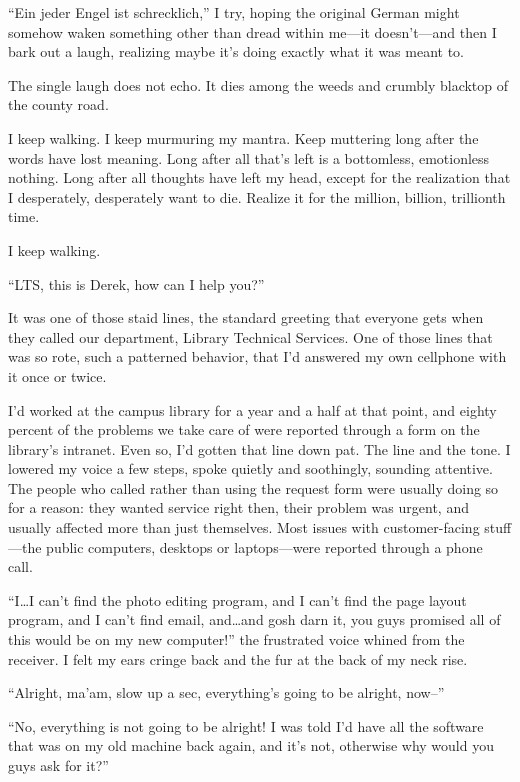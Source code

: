 ``Ein jeder Engel ist schrecklich,'' I try, hoping the original German might somehow waken something other than dread within me---it doesn't---and then I bark out a laugh, realizing maybe it's doing exactly what it was meant to.

The single laugh does not echo. It dies among the weeds and crumbly blacktop of the county road.

I keep walking. I keep murmuring my mantra. Keep muttering long after the words have lost meaning. Long after all that's left is a bottomless, emotionless nothing. Long after all thoughts have left my head, except for the realization that I desperately, desperately want to die. Realize it for the million, billion, trillionth time.

I keep walking.

\secdiv{}

\noindent ``LTS, this is Derek, how can I help you?''

It was one of those staid lines, the standard greeting that everyone gets when they called our department, Library Technical Services. One of those lines that was so rote, such a patterned behavior, that I'd answered my own cellphone with it once or twice.

I'd worked at the campus library for a year and a half at that point, and eighty percent of the problems we take care of were reported through a form on the library's intranet. Even so, I'd gotten that line down pat. The line and the tone. I lowered my voice a few steps, spoke quietly and soothingly, sounding attentive. The people who called rather than using the request form were usually doing so for a reason: they wanted service right then, their problem was urgent, and usually affected more than just themselves. Most issues with  customer-facing stuff---the public computers, desktops or laptops---were reported through a phone call.

``I\ldots{}I can't find the photo editing program, and I can't find the page layout program, and I can't find email, and\ldots{}and gosh darn it, you guys promised all of this would be on my new computer!'' the frustrated voice whined from the receiver. I felt my ears cringe back and the fur at the back of my neck rise.

``Alright, ma'am, slow up a sec, everything's going to be alright, now--''

``No, everything is not going to be alright! I was told I'd have all the software that was on my old machine back again, and it's not, otherwise why would you guys ask for it?''

